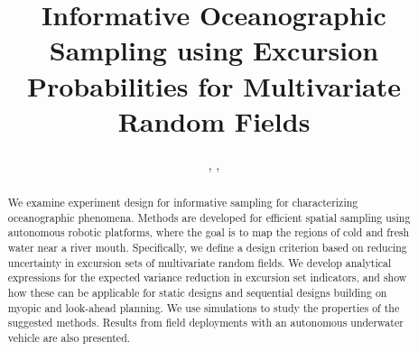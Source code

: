 \documentclass[aoas]{imsart}
\begin{document}
\begin{frontmatter}

\title{Informative Oceanographic Sampling using Excursion Probabilities for Multivariate Random Fields}


\author{ ,  ,     \and {} }

\address{Department of Marine Technology\\ Trondheim, Norway}

\address{Department of Mathematical Sciences }

\address{Idiap }

\address{Department of Engineering Cybernetics,}


\begin{abstract}
  We examine experiment design for informative sampling for
  characterizing oceanographic phenomena. Methods are developed
  for efficient spatial sampling using autonomous robotic platforms,
  where the goal is to map the regions of cold and fresh water near a
  river mouth. Specifically, we define a design criterion based on
  reducing uncertainty in excursion sets of multivariate
  random fields. We develop analytical expressions for the expected
  variance reduction in excursion set indicators, and show how these can be
  applicable for static designs and sequential designs building on
  myopic and look-ahead planning. We use simulations to study the
  properties of the suggested methods. Results from field
  deployments with an autonomous underwater vehicle are also presented.


\end{abstract}
\end{frontmatter}
\end{document}
